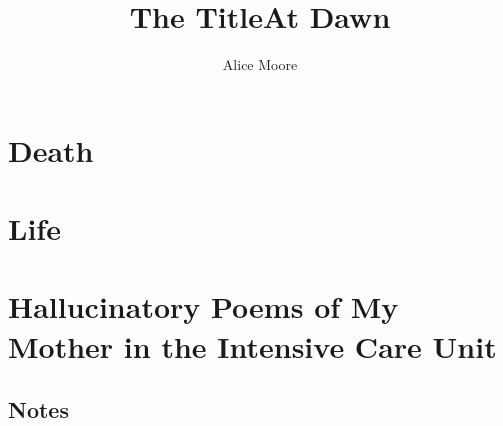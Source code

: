 \documentclass[statementpaper,oneside]{memoir}
\title{The Title}
\title{At Dawn}
\author{Alice Moore}
\date{}
\begin{document}
\begin{titlingpage}
\maketitle
\end{titlingpage}

\let\tocheadstart\relax
\tableofcontents*
\PlainPoemTitle

\renewcommand*{\beforepartskip}{\null\vskip 0pt plus 0.3fil}
\renewcommand\printpartnum{}
\renewcommand\printpartname{}
\part{Death}
\pagestyle{simple}









\part{Life}







\part{Hallucinatory Poems of My Mother in the Intensive Care Unit}






\renewcommand\appendixname{Notes}

\appendix

\chapter{Notes}


\end{document}
